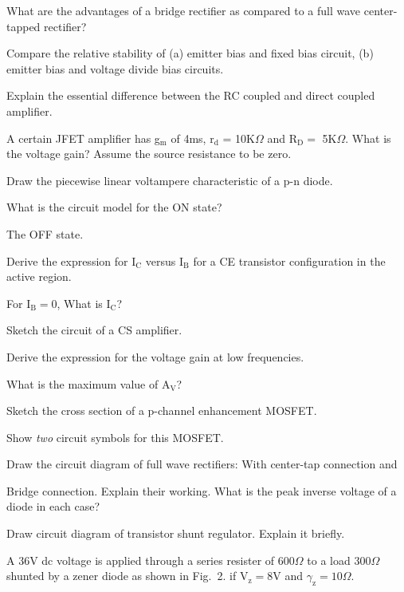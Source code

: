 \item What are the advantages of a bridge rectifier as compared to a full wave
  center-tapped rectifier?

\newpage \again

\item Compare the relative stability of (a) emitter bias and fixed bias circuit, (b)
  emitter bias and voltage divide bias circuits.
\item Explain the essential difference between the RC coupled and direct coupled amplifier.
\item A certain JFET amplifier has g$_\text{m}$ of 4ms, r$_\text{d}$ = 10K$\Omega$ and
  R$_\text{D} = $ 5K$\Omega$. What is the voltage gain? Assume the source resistance to be
  zero.

\markB
\partC

\item \iitem \iitem \iitem Draw the piecewise linear voltampere characteristic of a p-n diode.
\item What is the circuit model for the ON state?
\item The OFF state. 
\ene
\item \iitem Derive the expression for I$_\text{C}$ versus  I$_\text{B}$ for a CE
  transistor configuration in the active region.
\item For  I$_\text{B} = 0$, What is  I$_\text{C}$? 
\ene \ene
\Or
\item \iitem \iitem  Sketch the circuit of a CS amplifier.
\item Derive the expression for the voltage gain at low frequencies.
\item What is the maximum value of  A$_\text{V}$? 
\ene
\item \iitem Sketch the cross section of a p-channel enhancement MOSFET.
\item Show {\em two} circuit symbols for this MOSFET. 
\ene \ene\ene

\item \iitem Draw the circuit diagram of full wave rectifiers:
\iitem With center-tap connection and
\item Bridge connection. Explain their working.
\ene
  What is the peak inverse voltage of a diode in each case?
\Or
\item \iitem Draw circuit diagram of transistor shunt regulator. Explain it briefly. 
\item A 36V dc voltage is applied through a series resister of 600$\Omega$ to a load
  300$\Omega$ shunted by a zener diode as shown in \mbox{Fig. 2}. if V$_\text{z} = 8$V
  and $\gamma_\text{z} = 10 \Omega$.

